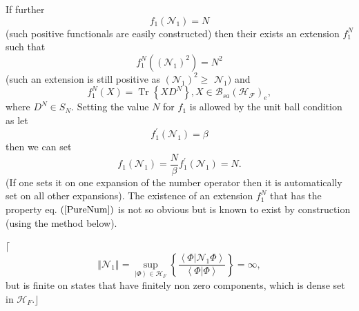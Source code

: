 \documentclass[aps,preprint]{revtex4}%
\begin{document}
If further
\begin{equation}
f_{1}\left(  \mathcal{N}_{1}\right)  =N \label{Trcon}%
\end{equation}
(such positive functionals are easily constructed) then their exists an
extension $f_{1}^{N}$ such that%
\begin{equation}
f_{1}^{N}\left(  \left(  \mathcal{N}_{1}\right)  ^{2}\right)  =N^{2}
\label{PureNum}%
\end{equation}
(such an extension is still positive as $\left(  \mathcal{N}_{1}\right)
^{2}\geq$ $\mathcal{N}_{1})$ and
\begin{equation}
f_{1}^{N}\left(  X\right)  =\operatorname*{Tr}\left\{  XD^{N}\right\}
,X\in\mathcal{B}_{sa}\left(  \mathcal{H}_{\mathcal{F}}\right)  _{e},
\end{equation}
where $D^{N}\in S_{N}.$ Setting the value $N$ for $f_{1}$ is allowed by the
unit ball condition as let
\begin{equation}
f_{1}^{\prime}\left(  \mathcal{N}_{1}\right)  =\beta
\end{equation}
then we can set
\begin{equation}
f_{1}\left(  \mathcal{N}_{1}\right)  =\frac{N}{\beta}f_{1}^{\prime}\left(
\mathcal{N}_{1}\right)  =N.
\end{equation}
(If one sets it on one expansion of the number operator then it is
automatically set on all other expansions). The existence of an extension
$f_{1}^{N}$ that has the property eq. $\left(  \ref{PureNum}\right)  $ is not
so obvious but is known to exist by construction (using the method below).

$\lceil$%
\begin{equation}
\left\Vert \mathcal{N}_{1}\right\Vert =\sup_{\left\vert \Phi\right\rangle
\in\mathcal{H}_{F}}\left\{  \frac{\left\langle \left.  \Phi\right\vert
\mathcal{N}_{1}\Phi\right\rangle }{\left\langle \left.  \Phi\right\vert
\Phi\right\rangle }\right\}  =\infty,
\end{equation}
but is finite on states that have finitely non zero components, which is dense
set in $\mathcal{H}_{F}$.$\rfloor$
\end{document}
